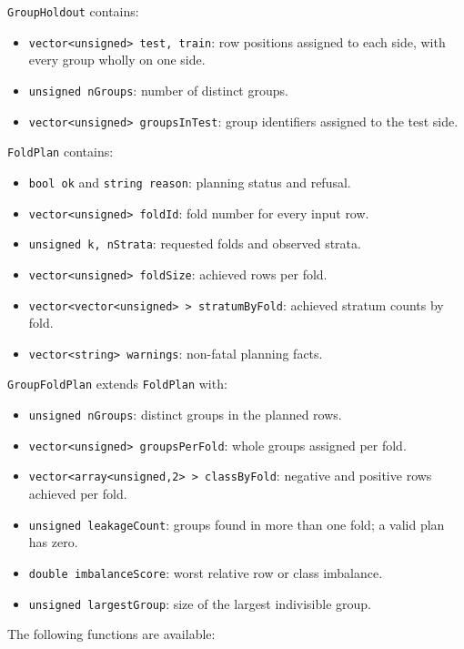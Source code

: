 \texttt{GroupHoldout} contains:

\begin{itemize}
\item \texttt{vector<unsigned> test, train}: row positions assigned to each
      side, with every group wholly on one side.
\item \texttt{unsigned nGroups}: number of distinct groups.
\item \texttt{vector<unsigned> groupsInTest}: group identifiers assigned to
      the test side.
\end{itemize}

\texttt{FoldPlan} contains:

\begin{itemize}
\item \texttt{bool ok} and \texttt{string reason}: planning status and refusal.
\item \texttt{vector<unsigned> foldId}: fold number for every input row.
\item \texttt{unsigned k, nStrata}: requested folds and observed strata.
\item \texttt{vector<unsigned> foldSize}: achieved rows per fold.
\item \texttt{vector<vector<unsigned> > stratumByFold}: achieved stratum counts
      by fold.
\item \texttt{vector<string> warnings}: non-fatal planning facts.
\end{itemize}

\texttt{GroupFoldPlan} extends \texttt{FoldPlan} with:

\begin{itemize}
\item \texttt{unsigned nGroups}: distinct groups in the planned rows.
\item \texttt{vector<unsigned> groupsPerFold}: whole groups assigned per fold.
\item \texttt{vector<array<unsigned,2> > classByFold}: negative and positive
      rows achieved per fold.
\item \texttt{unsigned leakageCount}: groups found in more than one fold; a
      valid plan has zero.
\item \texttt{double imbalanceScore}: worst relative row or class imbalance.
\item \texttt{unsigned largestGroup}: size of the largest indivisible group.
\end{itemize}

The following functions are available:

